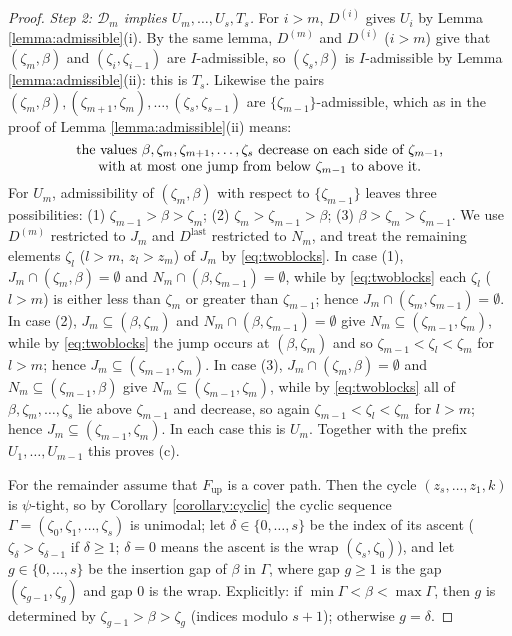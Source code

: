 \documentclass{amsart}
\theoremstyle{definition}
\theoremstyle{remark}
\numberwithin{equation}{section}
\begin{document}
\begin{proof}
\emph{Step 2: $\mathcal D_m$ implies $U_m,\ldots,U_s,T_s$.} For $i>m$, $D^{(i)}$ gives $U_i$ by Lemma \ref{lemma:admissible}(i). By the same lemma, $D^{(m)}$ and $D^{(i)}$ ($i>m$) give that $(\zeta_m,\beta)$ and $(\zeta_i,\zeta_{i-1})$ are $I$-admissible, so $(\zeta_s,\beta)$ is $I$-admissible by Lemma \ref{lemma:admissible}(ii): this is $T_s$. Likewise the pairs $(\zeta_m,\beta),(\zeta_{m+1},\zeta_m),\ldots,(\zeta_s,\zeta_{s-1})$ are $\{\zeta_{m-1}\}$-admissible, which as in the proof of Lemma \ref{lemma:admissible}(ii) means:
\begin{equation}\label{eq:twoblocks}
\parbox{0.85\textwidth}{\centering the values $\beta,\zeta_m,\zeta_{m+1},\ldots,\zeta_s$ decrease on each side of $\zeta_{m-1}$,\\ with at most one jump from below $\zeta_{m-1}$ to above it.}
\end{equation}
For $U_m$, admissibility of $(\zeta_m,\beta)$ with respect to $\{\zeta_{m-1}\}$ leaves three possibilities: (1) $\zeta_{m-1}>\beta>\zeta_m$; (2) $\zeta_m>\zeta_{m-1}>\beta$; (3) $\beta>\zeta_m>\zeta_{m-1}$. We use $D^{(m)}$ restricted to $J_m$ and $D^{\mathrm{last}}$ restricted to $N_m$, and treat the remaining elements $\zeta_l$ ($l>m$, $z_l>z_m$) of $J_m$ by \eqref{eq:twoblocks}. In case (1), $J_m\cap(\zeta_m,\beta)=\emptyset$ and $N_m\cap(\beta,\zeta_{m-1})=\emptyset$, while by \eqref{eq:twoblocks} each $\zeta_l$ ($l>m$) is either less than $\zeta_m$ or greater than $\zeta_{m-1}$; hence $J_m\cap(\zeta_m,\zeta_{m-1})=\emptyset$. In case (2), $J_m\subseteq(\beta,\zeta_m)$ and $N_m\cap(\beta,\zeta_{m-1})=\emptyset$ give $N_m\subseteq(\zeta_{m-1},\zeta_m)$, while by \eqref{eq:twoblocks} the jump occurs at $(\beta,\zeta_m)$ and so $\zeta_{m-1}<\zeta_l<\zeta_m$ for $l>m$; hence $J_m\subseteq(\zeta_{m-1},\zeta_m)$. In case (3), $J_m\cap(\zeta_m,\beta)=\emptyset$ and $N_m\subseteq(\zeta_{m-1},\beta)$ give $N_m\subseteq(\zeta_{m-1},\zeta_m)$, while by \eqref{eq:twoblocks} all of $\beta,\zeta_m,\ldots,\zeta_s$ lie above $\zeta_{m-1}$ and decrease, so again $\zeta_{m-1}<\zeta_l<\zeta_m$ for $l>m$; hence $J_m\subseteq(\zeta_{m-1},\zeta_m)$. In each case this is $U_m$. Together with the prefix $U_1,\ldots,U_{m-1}$ this proves (c).

For the remainder assume that $F_{\mathrm{up}}$ is a cover path. Then the cycle $(z_s,\ldots,z_1,k)$ is $\psi$-tight, so by Corollary \ref{corollary:cyclic} the cyclic sequence $\Gamma=(\zeta_0,\zeta_1,\ldots,\zeta_s)$ is unimodal; let $\delta\in\{0,\ldots,s\}$ be the index of its ascent ($\zeta_\delta>\zeta_{\delta-1}$ if $\delta\geq1$; $\delta=0$ means the ascent is the wrap $(\zeta_s,\zeta_0)$), and let $g\in\{0,\ldots,s\}$ be the insertion gap of $\beta$ in $\Gamma$, where gap $g\geq1$ is the gap $(\zeta_{g-1},\zeta_g)$ and gap $0$ is the wrap. Explicitly: if $\min\Gamma<\beta<\max\Gamma$, then $g$ is determined by $\zeta_{g-1}>\beta>\zeta_g$ (indices modulo $s+1$); otherwise $g=\delta$.


\end{proof}
\end{document}
